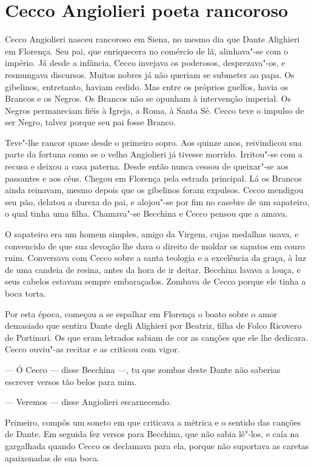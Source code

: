 \chapter{Cecco Angiolieri poeta rancoroso}

Cecco Angiolieri nasceu rancoroso em Siena, no mesmo dia que Dante
Alighieri em Florença. Seu pai, que enriquecera no comércio de lã,
alinhava"-se com o império. Já desde a infância, Cecco invejava os
poderosos, desprezava"-os, e resmungava discursos. Muitos nobres já não
queriam se submeter ao papa. Os gibelinos, entretanto, haviam cedido. Mas
entre os próprios guelfos, havia os Brancos e os Negros. Os Brancos não se
opunham à intervenção imperial. Os Negros permaneciam fiéis à Igreja, a
Roma, à Santa Sé. Cecco teve o impulso de ser Negro, talvez porque seu pai
fosse Branco.

Teve"-lhe rancor quase desde o primeiro sopro. Aos quinze anos, reivindicou
sua parte da fortuna como se o velho Angiolieri já tivesse morrido.
Irritou"-se com a recusa e deixou a casa paterna. Desde então nunca cessou
de queixar"-se aos passantes e aos céus. Chegou em Florença pela estrada
principal. Lá os Brancos ainda reinavam, mesmo depois que os gibelinos
foram expulsos. Cecco mendigou seu pão, delatou a dureza do pai, e
alojou"-se por fim no casebre de um sapateiro, o qual tinha uma filha.
Chamava"-se Becchina e Cecco pensou que a amava.

O sapateiro era um homem simples, amigo da Virgem, cujas medalhas usava, e
convencido de que sua devoção lhe dava o direito de moldar os sapatos em
couro ruim. Conversava com Cecco sobre a santa teologia e a excelência da
graça, à luz de uma candeia de resina, antes da hora de ir deitar.
Becchina lavava a louça, e seus cabelos estavam sempre embaraçados.
Zombava de Cecco porque ele tinha a boca torta.

Por esta época, começou a se espalhar em Florença o boato sobre o amor
demasiado que sentira Dante degli Alighieri por Beatriz, filha de Folco
Ricovero de Portinari. Os que eram letrados sabiam de cor as canções que
ele lhe dedicara. Cecco ouviu"-as recitar e as criticou com vigor.

--- Ó Cecco --- disse Becchina ---, tu que zombas deste Dante não saberias escrever
versos tão belos para mim.

--- Veremos --- disse Angiolieri escarnecendo.

Primeiro, compôs um soneto em que criticava a métrica e o sentido das
canções de Dante. Em seguida fez versos para Becchina, que não sabia
lê"-los, e caía na gargalhada quando Cecco os declamava para ela, porque
não suportava as caretas apaixonadas de sua boca.

